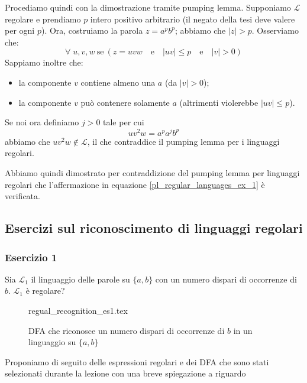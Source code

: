 \documentclass[class=book, crop=false, oneside, 12pt]{standalone}
\begin{document}
Procediamo quindi con la dimostrazione tramite pumping lemma. Supponiamo \(\mathcal{L}\) regolare e prendiamo \(p\) intero positivo arbitrario (il negato della tesi deve valere per ogni \(p\)). Ora, costruiamo la parola \(z=a^p b^p\); abbiamo che \(|z|>p\).
Osserviamo che:
\begin{equation*}
    \forall \; u,v,w \ \textrm{se} \ (z = uvw \quad \textrm{e} \quad |uv| \le p \quad \textrm{e} \quad |v| > 0)
\end{equation*}
Sappiamo inoltre che:
\begin{itemize}
    \item la componente \(v\) contiene almeno una \(a\) (da \(|v| > 0\));
    \item la componente \(v\) può contenere solamente \(a\) (altrimenti violerebbe \(|uv| \le p\)).
\end{itemize}
Se noi ora definiamo \(j > 0\) tale per cui 
\begin{equation*}
    uv^2w = a^pa^jb^p 
\end{equation*}
abbiamo che \(uv^2w \notin \mathcal{L}\), il che contraddice il pumping lemma per i linguaggi regolari.

Abbiamo quindi dimostrato per contraddizione del pumping lemma per linguaggi regolari che l'affermazione in equazione \ref{pl_regular_languages_ex_1} è verificata.

\subsection{Esercizi sul riconoscimento di linguaggi regolari}
\subsubsection{Esercizio 1}
Sia \(\mathcal{L}_1\) il linguaggio delle parole su \(\{a, b\}\) con un numero dispari di occorrenze di \(b\). \(\mathcal{L}_1\) è regolare?
\begin{figure}[H]
    \centering
    {regual_recognition_es1.tex}
    \caption{DFA che riconosce un numero dispari di occorrenze di \(b\) in un linguaggio su \(\{a,b\}\)}
    \label{b_dispari}
\end{figure}

Proponiamo di seguito delle espressioni regolari e dei DFA che sono stati selezionati durante la lezione con una breve spiegazione a riguardo 
\end{document}
